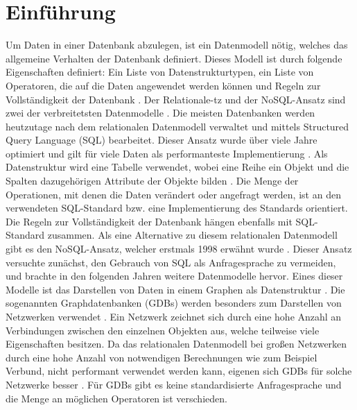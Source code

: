 
\chapter{Einführung} %

\label{Kaptiel1} %


\newcommand{\keyword}[1]{\textit{#1}}
\newcommand{\tabhead}[1]{\textbf{#1}}
\newcommand{\code}[1]{\texttt{#1}}
\newcommand{\file}[1]{\texttt{\bfseries#1}}
\newcommand{\option}[1]{\texttt{\itshape#1}}

Um Daten in einer Datenbank abzulegen, ist ein Datenmodell nötig, welches das allgemeine Verhalten der Datenbank definiert. Dieses Modell ist durch folgende Eigenschaften definiert: Ein Liste von Datenstrukturtypen, ein Liste von Operatoren, die auf die Daten angewendet werden können und Regeln zur Vollständigkeit der Datenbank \parencite{codd1981data}. Der Relationale-tz und der NoSQL-Ansatz sind zwei der verbreitetsten Datenmodelle \parencite{vicknair2010comparison}. \newline
Die meisten Datenbanken werden heutzutage nach dem relationalen Datenmodell verwaltet und mittels Structured Query Language (SQL) bearbeitet. Dieser Ansatz wurde über viele Jahre optimiert und gilt für viele Daten als performanteste Implementierung \parencite{miller2013graph}. Als Datenstruktur wird eine Tabelle verwendet, wobei eine Reihe ein Objekt  und die Spalten dazugehörigen Attribute der Objekte bilden \parencite{tatarinov2002storing}. Die Menge der Operationen, mit denen die Daten verändert oder angefragt werden, ist an den verwendeten SQL-Standard bzw. eine Implementierung des Standards orientiert. Die Regeln zur Vollständigkeit der Datenbank hängen ebenfalls mit SQL-Standard zusammen.  \newline 
Als eine Alternative zu diesem relationalen Datenmodell gibt es den NoSQL-Ansatz, welcher erstmals 1998 erwähnt wurde \parencite{strauch2011nosql}. Dieser Ansatz versuchte zunächst, den Gebrauch von SQL als Anfragesprache zu vermeiden, und brachte in den folgenden Jahren weitere Datenmodelle hervor. Eines dieser Modelle ist das Darstellen von Daten in einem Graphen als Datenstruktur \parencite{miller2013graph}. Die sogenannten Graphdatenbanken (GDBs) werden besonders zum Darstellen von Netzwerken verwendet \parencite{han2011survey}. Ein Netzwerk zeichnet sich durch eine hohe Anzahl an Verbindungen zwischen den einzelnen Objekten aus, welche teilweise viele Eigenschaften besitzen. Da das relationalen Datenmodell bei großen Netzwerken durch eine hohe Anzahl von notwendigen Berechnungen wie zum Beispiel Verbund, nicht performant verwendet werden kann, eigenen sich GDBs für solche Netzwerke besser \parencite{miller2013graph}. Für GDBs gibt es keine standardisierte Anfragesprache und  die Menge an möglichen Operatoren ist verschieden.
